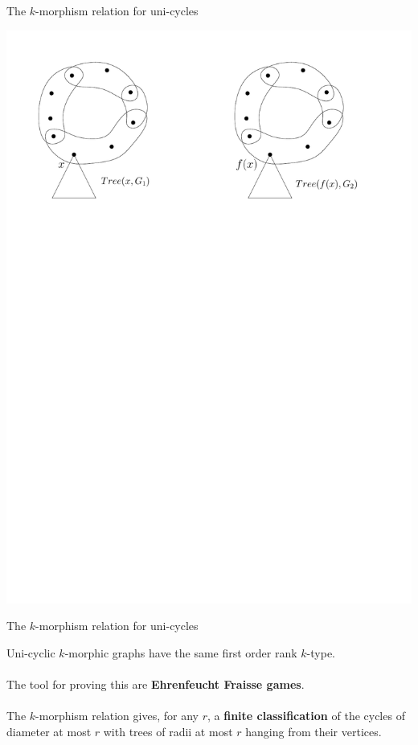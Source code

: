 \documentclass[11pt]{beamer}
\begin{document}
	\begin{frame}{The $k$-morphism relation for uni-cycles}
	\begin{center}
	\vspace{2.3em}
	\includegraphics[width=\linewidth]{KmorphicCycles3.pdf}
	\end{center}
	\end{frame}

	\begin{frame}{The $k$-morphism relation for uni-cycles}
	
		Uni-cyclic $k$-morphic graphs have the same
		first order rank $k$-type.	\\~\\
		
		The tool for proving this are \textbf{Ehrenfeucht Fraisse games}.
		\\~\\
		
		The $k$-morphism relation gives, for any $r$, a \textbf{finite classification} of the cycles of diameter
		at most $r$ with trees of radii at most $r$ hanging from their vertices. 
		
	\end{frame}
\end{document}
